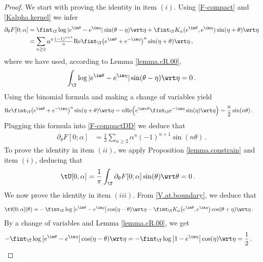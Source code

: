 \documentclass[a4paper,reqno,10pt]{article}
\newcommand{\pa}{\partial}
\begin{document}
\begin{proof}
We start with proving the identity in item $(i)$. Using \eqref{F-compact} and \eqref{Kalpha.kernel}  we infer
    \begin{align}\label{F-compactDD}
\nonumber \pa_\theta F[0;\alpha] 
		& =    \fint_{\T} \log |  e^{\im\theta} -  e^{\im\eta} |  \sin(\theta-\eta)  \wrt \eta +  \fint_{\T} K_\alpha (  e^{\im\theta},  e^{\im\eta} ) \sin(\eta+\theta)  \wrt \eta\\
        &=
\sum_{n\geq 2} \alpha^{n}\tfrac{(-1)^{n+1}}{n} {\rm Re}\fint_{\T} \big( e^{\im\theta}+e^{-\im\eta} \big)^n \sin(\eta+\theta)  \wrt \eta\,, 
\end{align}
where we have used, according to Lemma \ref{lemma.cR.00},
$$
\int_{\T} \log |  e^{\im\theta} -  e^{\im\eta} |  \sin(\theta-\eta)  \wrt \eta =0 \,.
$$
Using the binomial formula and making a change of variables yield
\begin{align}\label{binom.RE}
 {\rm Re}\fint_{\T}\big( e^{\im\theta}+e^{-\im\eta} \big)^n \sin(\eta+\theta)  \wrt \eta&= n{\rm Re}\Big(e^{\im n\theta}\fint_{\T}e^{-\im  \eta}  \sin(\eta)  \wrt \eta\Big) =\frac{n}{2}\sin(n\theta) \,. 
\end{align}
Plugging this formula into  \eqref{F-compactDD} we deduce that
\begin{align*}
 \pa_\theta F[0;\alpha] 
        &=\frac{1}{2}\sum_{n\geq 2} \alpha^{n}(-1)^{n+1}  \sin(n \theta) \,.
\end{align*}
To prove  the identity in item $(ii)$, we apply Proposition \ref{lemma.constrain} and item $(i)$, deducing that
\begin{align*}
    \tU[0,\alpha] &=\frac{1}{\pi} \int_{\T}\partial_\theta F[0;\alpha]\sin(\theta) \wrt \theta =0 \,.
\end{align*}
We now prove the identity in item $(iii)$. From \eqref{V.at.boundary},  we deduce that
\begin{align*}
			\nonumber \tV[0;\alpha](\theta) =& -  \fint_{\T} \log\big| e^{\im\theta}-  e^{\im\eta} \big| \cos(\eta-\theta)  \wrt\eta 
			-   \fint_{\T} K_\alpha\big( e^{\im\theta},  e^{\im\eta} \big)   \cos(\theta+\eta)  \wrt \eta  \,.
		\end{align*}
        By a change of variables and Lemma \ref{lemma.cR.00}, we get
        \begin{align*}
        - \fint_{\T} \log\big| e^{\im\theta}-  e^{\im\eta} \big| \cos(\eta-\theta)  \wrt\eta&=- \fint_{\T} \log\big| 1-  e^{\im\eta} \big| \cos(\eta)  \wrt\eta =\frac12 \,.
        \end{align*}

\end{proof}
\end{document}
